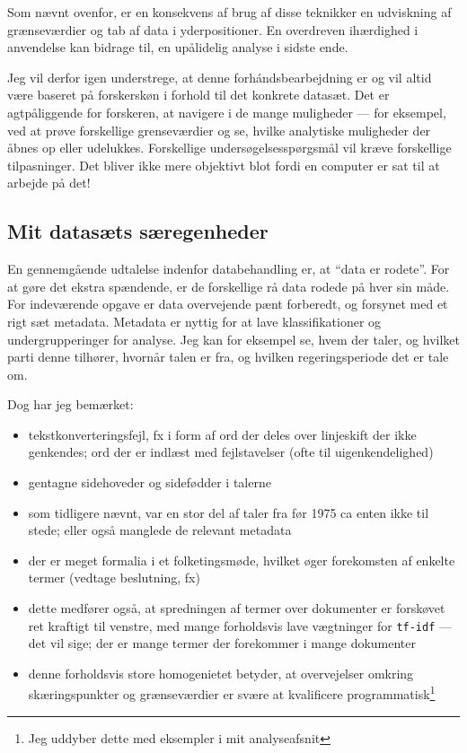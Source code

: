 Som nævnt ovenfor, er en konsekvens af brug af disse teknikker en udviskning af grænseværdier og tab af data i yderpositioner.
En overdreven ihærdighed i anvendelse kan bidrage til, en upålidelig analyse i sidste ende.

Jeg vil derfor igen understrege, at denne forhándsbearbejdning er og vil altid være baseret på forskerskøn i forhold til det konkrete datasæt.
Det er agtpåliggende for forskeren, at navigere i de mange muligheder — for eksempel, ved at prøve forskellige grenseværdier og se, hvilke analytiske muligheder der åbnes op eller udelukkes.
Forskellige undersøgelsesspørgsmål vil kræve forskellige tilpasninger.
Det bliver ikke mere objektivt blot fordi en computer er sat til at arbejde på det!

\subsection{Mit datasæts særegenheder}

En gennemgående udtalelse indenfor databehandling er, at “data er rodete”.
For at gøre det ekstra spændende, er de forskellige rå data rodede på hver sin måde.
For indeværende opgave er data overvejende pænt forberedt, og forsynet med et rigt sæt metadata.
Metadata er nyttig for at lave klassifikationer og undergrupperinger for analyse.
Jeg kan for eksempel se, hvem der taler, og hvilket parti denne tilhører, hvornår talen er fra, og hvilken regeringsperiode det er tale om.

Dog har jeg bemærket:
\begin{itemize}
  \item
    tekstkonverteringsfejl, fx i form af ord der deles over linjeskift der ikke genkendes; ord der er indlæst med fejlstavelser (ofte til uigenkendelighed)
  \item
    gentagne sidehoveder og sidefødder i talerne
  \item
    som tidligere nævnt, var en stor del af taler fra før 1975 ca enten ikke til stede; eller også manglede de relevant metadata
  \item
    der er meget formalia i et folketingsmøde, hvilket øger forekomsten af enkelte termer (vedtage beslutning, fx)
  \item
    dette medfører også, at spredningen af termer over dokumenter er forskøvet ret kraftigt til venstre, med mange forholdsvis lave vægtninger for \texttt{tf-idf} — det vil sige; der er mange termer der forekommer i mange dokumenter
  \item
    denne forholdsvis store homogenietet betyder, at overvejelser omkring skæringspunkter og grænseværdier er svære at kvalificere programmatisk\footnote{Jeg uddyber dette med eksempler i mit analyseafsnit}
\end{itemize}


